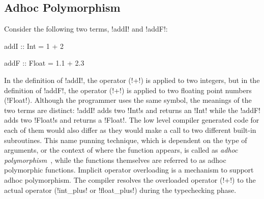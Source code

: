 \documentclass[screen,nonacm,manuscript,review]{acmart} %
\begin{document}
\subsection{Adhoc Polymorphism}
Consider the following two terms, !addI! and !addF!:

\begin{minipage}[ht]{0.5\linewidth}
\begin{CenteredBox}
\begin{code}
addI :: Int = 1 + 2
\end{code}
\end{CenteredBox}
\end{minipage}%
\begin{minipage}[ht]{0.5\linewidth}
\begin{CenteredBox}
\begin{code}
addF :: Float = 1.1 + 2.3
\end{code}
\end{CenteredBox}
\end{minipage}

In the definition of !addI!, the operator (!+!) is applied to two
integers, but in the definition of !addF!, the operator (!+!) is
applied to two floating point numbers (!Float!). Although the
programmer uses the same symbol, the meanings of the two terms are
distinct: !addI! adds two !Int!s and returns an !Int! while the !addF!
adds two !Float!s and returns a !Float!. The low level compiler generated code
for each of them would also differ as they would make a call to two
different built-in subroutines. This name punning technique, which is dependent on the
type of arguments, or the context of where the function appears, is called as \emph{adhoc
polymorphism}~\cite{strachey_fundamental_2000}, while the functions
themselves are referred to as adhoc polymorphic functions. Implicit
operator overloading is a mechanism to support adhoc polymorphism.
The compiler resolves the overloaded operator (!+!) to
the actual operator (!int_plus! or !float_plus!) during the typechecking phase.
\end{document}
